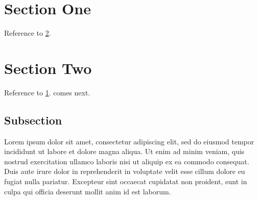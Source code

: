 \hypertarget{section-one}{%
\section{Section One}\label{section-one}}

Reference to \cref{sec:2}.

\hypertarget{sec:2}{%
\section{Section Two}\label{sec:2}}

Reference to \cref{section-one}.  comes next.

\hypertarget{subsection}{%
\subsection{Subsection}\label{subsection}}

Lorem ipsum dolor sit amet, consectetur adipiscing elit, sed do eiusmod
tempor incididunt ut labore et dolore magna aliqua. Ut enim ad minim
veniam, quis nostrud exercitation ullamco laboris nisi ut aliquip ex ea
commodo consequat. Duis aute irure dolor in reprehenderit in voluptate
velit esse cillum dolore eu fugiat nulla pariatur. Excepteur sint
occaecat cupidatat non proident, sunt in culpa qui officia deserunt
mollit anim id est laborum.
